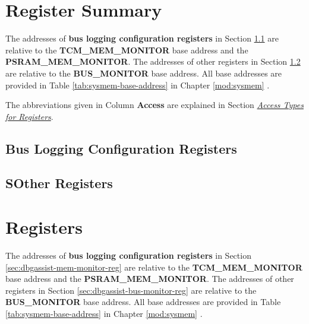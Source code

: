 \documentclass[main\_\_EN.tex]{subfiles}
\begin{document}
\newpage
\begin{landscape}
\hypertarget{dbgassist-reg-summ}{}
\section{Register Summary}
\label{sec:dbgassist-reg-summ}

The addresses of \textbf{bus logging configuration registers} in Section \ref{sec:dbgassist-mem-monitor-reg-summ} are relative to the \textbf{TCM\_MEM\_MONITOR} base address and the \textbf{PSRAM\_MEM\_MONITOR}. The addresses of other registers in Section \ref{sec:dbgassist-bus-monitor-reg-summ} are relative to the \textbf{BUS\_MONITOR} base address. All base addresses are provided in Table \ref{tab:sysmem-base-address} in Chapter \ref{mod:sysmem} \textit{}.

The abbreviations given in Column \textbf{Access} are explained in Section \hyperref[glossary-access-types]{\textit{Access Types for Registers}}.

\subsection{Bus Logging Configuration Registers}
\label{sec:dbgassist-mem-monitor-reg-summ}



\subsection{SOther Registers}
\label{sec:dbgassist-bus-monitor-reg-summ}


\end{landscape}



\newpage
\section{Registers}

The addresses of \textbf{bus logging configuration registers} in Section \ref{sec:dbgassist-mem-monitor-reg} are relative to the \textbf{TCM\_MEM\_MONITOR} base address and the \textbf{PSRAM\_MEM\_MONITOR}. The addresses of other registers in Section \ref{sec:dbgassist-bus-monitor-reg} are relative to the \textbf{BUS\_MONITOR} base address. All base addresses are provided in Table \ref{tab:sysmem-base-address} in Chapter \ref{mod:sysmem} \textit{}.
\end{document}
